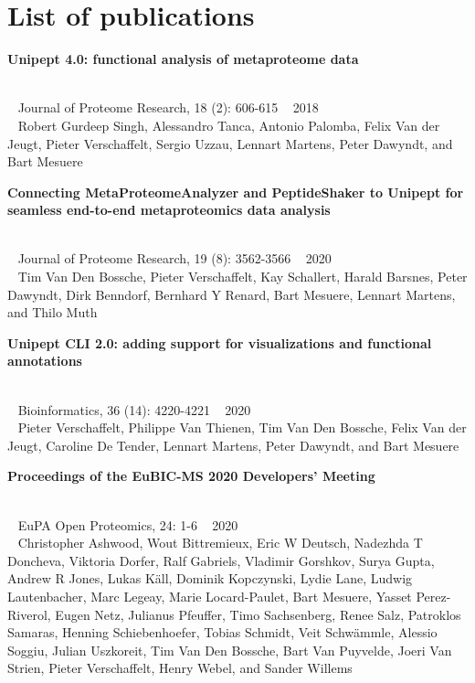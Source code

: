 \chapter*{List of publications}

\begin{large}\textbf{\textsf{Unipept 4.0: functional analysis of metaproteome data}}\end{large} \\
\faBook ~ \textsf{Journal of Proteome Research, 18 (2): 606-615} \hfill \faCalendar ~ \textsf{2018} \\
{
    \myriad
    \faUser ~ Robert Gurdeep Singh, Alessandro Tanca, Antonio Palomba, Felix Van der Jeugt, \textsf{Pieter Verschaffelt}, Sergio Uzzau, Lennart Martens, Peter Dawyndt, and Bart Mesuere \\
}

\begin{large}\textbf{\textsf{Connecting MetaProteomeAnalyzer and PeptideShaker to Unipept for seamless end-to-end metaproteomics data analysis}}\end{large} \\
\faBook ~ \textsf{Journal of Proteome Research, 19 (8): 3562-3566} \hfill \faCalendar ~ \textsf{2020} \\
{
    \myriad
    \faUser ~ Tim Van Den Bossche, \textsf{Pieter Verschaffelt}, Kay Schallert, Harald Barsnes, Peter Dawyndt, Dirk Benndorf, Bernhard Y Renard, Bart Mesuere, Lennart Martens, and Thilo Muth \\
}

\begin{large}\textbf{\textsf{Unipept CLI 2.0: adding support for visualizations and functional annotations}}\end{large} \\
\faBook ~ \textsf{Bioinformatics, 36 (14): 4220-4221} \hfill \faCalendar ~ \textsf{2020} \\
{
    \myriad
    \faUser ~ \textsf{Pieter Verschaffelt}, Philippe Van Thienen, Tim Van Den Bossche, Felix Van der Jeugt, Caroline De Tender, Lennart Martens, Peter Dawyndt, and Bart Mesuere \\
}

\begin{large}\textbf{\textsf{Proceedings of the EuBIC-MS 2020 Developers' Meeting}}\end{large} \\
\faBook ~ \textsf{EuPA Open Proteomics, 24: 1-6} \hfill \faCalendar ~ \textsf{2020} \\
{
    \myriad
    \faUser ~ Christopher Ashwood, Wout Bittremieux, Eric W Deutsch, Nadezhda T Doncheva, Viktoria Dorfer, Ralf Gabriels, Vladimir Gorshkov, Surya Gupta, Andrew R Jones, Lukas Käll, Dominik Kopczynski, Lydie Lane, Ludwig Lautenbacher, Marc Legeay, Marie Locard-Paulet, Bart Mesuere, Yasset Perez-Riverol, Eugen Netz, Julianus Pfeuffer, Timo Sachsenberg, Renee Salz, Patroklos Samaras, Henning Schiebenhoefer, Tobias Schmidt, Veit Schwämmle, Alessio Soggiu, Julian Uszkoreit, Tim Van Den Bossche, Bart Van Puyvelde, Joeri Van Strien, \textsf{Pieter Verschaffelt}, Henry Webel, and Sander Willems \\
}

